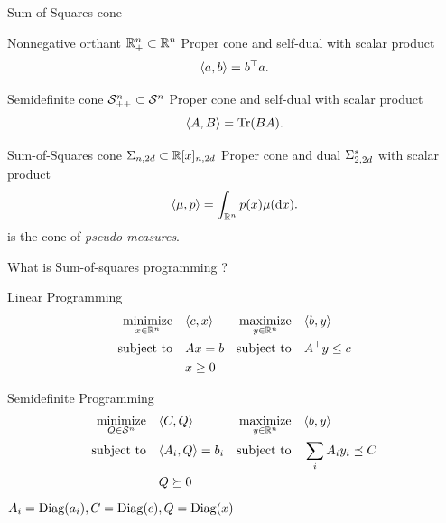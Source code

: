 \documentclass{beamer}
\begin{document}
  \begin{frame}{Sum-of-Squares cone}
    \begin{block}{Nonnegative orthant $\R^n_+ \subset \R^n$}
      Proper cone and self-dual with scalar product
      \[ \la a, b \ra = b^\Tr a. \]
    \end{block}
    \vspace{-1.5em}
    \begin{block}{Semidefinite cone $\Psd \subset \SymK$}
      Proper cone and self-dual with scalar product
      \[ \la A, B \ra = \trace(B A). \]
    \end{block}
    \vspace{-1.5em}
    \begin{block}{Sum-of-Squares cone $\Sos[n, 2d] \subset \R[x]_{n, 2d}$}
      Proper cone and dual $\Sos[2, 2d]^*$ with scalar product
      \[ \la \mu, p \ra = \int_{\R^n} p(x) \mu(\dif x). \]
      is the cone of \emph{pseudo measures}.
    \end{block}
  \end{frame}
  \begin{frame}{What is Sum-of-squares programming ?}
    \begin{block}{Linear Programming}
      \vspace{-1em}
      \begin{align*}
        \mini_{x \in \R^n}\quad & \la c, x \ra & \maxi_{y \in \R^n} \quad & \la b, y \ra\\
        \subtoq & Ax = b & \subtoq & A^\Tr y \leq c\\
        & x \geq 0
      \end{align*}
    \end{block}
    \vspace{-2em}
    \begin{block}{Semidefinite Programming}
      \vspace{-1em}
      \begin{align*}
        \mini_{Q \in \SymK} \quad & \la C, Q \ra & \maxi_{y \in \R^n} \quad & \la b, y \ra\\
        \subtoq & \la A_i, Q \ra = b_i & \subtoq & \sum_i A_i y_i \preceq C\\
          & Q \succeq 0
      \end{align*}
      $A_i = \Diag(a_i), C = \Diag(c), Q = \Diag(x)$
    \end{block}
  \end{frame}
\end{document}
